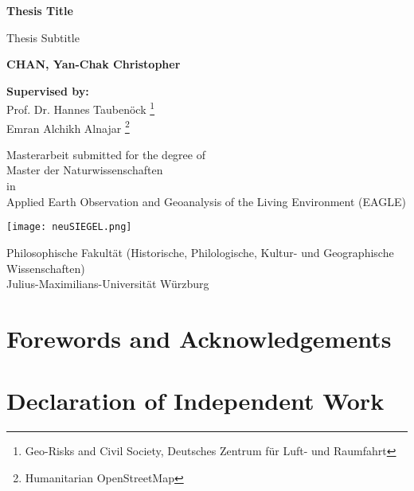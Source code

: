 \documentclass[11pt, a4paper, twoside]{report}
\begin{document}
\begin{titlepage}
   \begin{center}
       \vspace*{1cm}

       \huge
       \textbf{Thesis Title}

       \vspace{0.5cm}
       \Large
       Thesis Subtitle

       \vspace{1.5cm}

       \textbf{CHAN, Yan-Chak Christopher}

       \vspace{0.5cm}
       \textbf{Supervised by:} \\
       Prof. Dr. Hannes Taubenöck \thanks{Geo-Risks and Civil Society, Deutsches Zentrum für Luft- und Raumfahrt} \\
       Emran Alchikh Alnajar \thanks{Humanitarian OpenStreetMap}

       \vfill

       Masterarbeit submitted for the degree of\\
       Master der Naturwissenschaften\\
       in\\
       Applied Earth Observation and Geoanalysis of the Living Environment (EAGLE)

       \vspace{0.8cm}

       \texttt{[image: neuSIEGEL.png]}

       \normalsize
       Philosophische Fakultät (Historische, Philologische, Kultur- und Geographische Wissenschaften)\\
       Julius-Maximilians-Universität Würzburg\\
   \end{center}
\end{titlepage}

\newpage

\section{Forewords and Acknowledgements}
\pagestyle{empty}

\newpage

\section{Declaration of Independent Work}
\pagestyle{empty}
\end{document}
